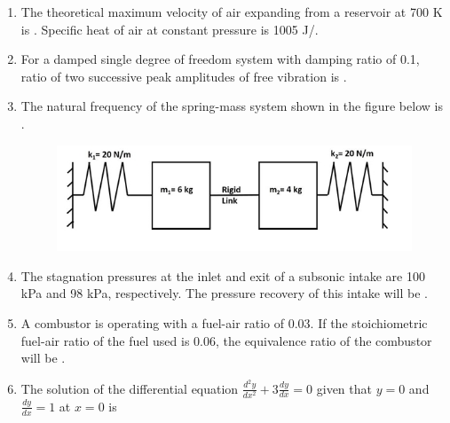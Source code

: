 \documentclass[journal,12pt,onecolumn]{IEEEtran}
\theoremstyle{remark}
\begin{document}
\begin{enumerate}
    \item The theoretical maximum velocity  of air expanding from a reservoir at 700 K is \underline{\hspace{2cm}} . Specific heat of air at constant pressure is 1005 J/.
    \hfill{}

    \item For a damped single degree of freedom system with damping ratio of 0.1, ratio of two successive peak amplitudes of free vibration is \underline{\hspace{2cm}} .
    \hfill{}

    \item The natural frequency  of the spring-mass system shown in the figure below is \underline{\hspace{2cm}} .
    \hfill{}
    
    \begin{figure}[H]
        \centering
        \includegraphics[width=0.8\columnwidth]{q23}
        \caption*{}
        \label{fig:q23}
    \end{figure}

    \item The stagnation pressures at the inlet and exit of a subsonic intake are 100 kPa and 98 kPa, respectively. The pressure recovery of this intake will be \underline{\hspace{2cm}} .
    \hfill{}

    \item A combustor is operating with a fuel-air ratio of 0.03. If the stoichiometric fuel-air ratio of the fuel used is 0.06, the equivalence ratio of the combustor will be \underline{\hspace{2cm}} .
    \hfill{}

    \item The solution of the differential equation $\frac{d^{2}y}{dx^{2}}+3\frac{dy}{dx}=0$ given that $y=0$ and $\frac{dy}{dx}=1$ at $x=0$ is
    \hfill{}


\end{enumerate}
\end{document}
